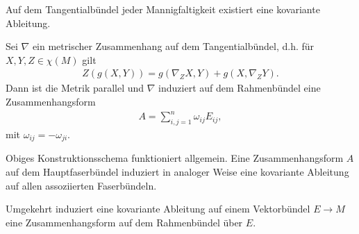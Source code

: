 \documentclass[%
	paper=a5,%
	fleqn,%
	DIV=18,%
	BCOR=0mm,
	fontsize=11pt,
	titlepage=false,%
	bibliography=totoc,
	DIV=18,%
	twoside=true,
	pdftitle=Riemannsche Geometrie,
	pdfauthor=Uwe Semmelmann,
	numbers=noendperiod]%
	{scrbook}
\begin{document}
\begin{rem}[Bemerkungen.]
\begin{remenum}
\item
Auf dem Tangentialbündel jeder Mannigfaltigkeit existiert eine kovariante
Ableitung.
\item
Sei $\nabla$ ein metrischer Zusammenhang auf dem Tangentialbündel, d.h. für
$X,Y,Z\in\chi(M)$ gilt
\begin{align*}
Z(g(X,Y)) = g(\nabla_Z X,Y) + g(X,\nabla_Z Y).
\end{align*}
Dann ist die Metrik parallel und $\nabla$ induziert auf dem Rahmenbündel eine
Zusammenhangsform
\begin{align*}
A = \sum_{i,j=1}^n \omega_{ij}E_{ij},
\end{align*}
mit $\omega_{ij} = - \omega_{ji}$.
\item Obiges Konstruktionsschema funktioniert allgemein. Eine
Zusammenhangsform $A$ auf dem Hauptfaserbündel induziert in analoger Weise eine
kovariante Ableitung auf allen assoziierten Faserbündeln.

Umgekehrt induziert eine kovariante Ableitung auf einem Vektorbündel $E\to M$
eine Zusammenhangsform auf dem Rahmenbündel über $E$.\map
\end{remenum}
\end{rem}
\end{document}
